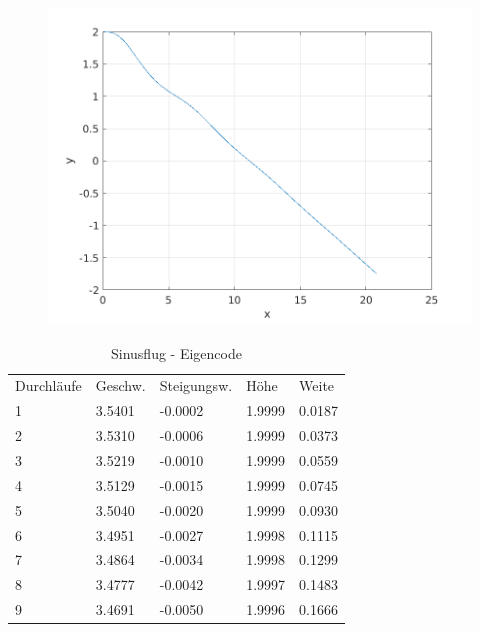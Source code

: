 \documentclass[a4paper,12pt]{scrartcl}
\begin{document}
\begin{figure}[htp]
	\centering
	\includegraphics{flightpath2.png}
	\label{fig:sin}
\end{figure}
\begin{table}
\centering
\caption{Sinusflug - Eigencode}
\begin{tabular}{lllll}
Durchläufe & Geschw. & Steigungsw. & Höhe   & Weite   \\
1          & 3.5401  & -0.0002     & 1.9999 & 0.0187  \\
2          & 3.5310  & -0.0006     & 1.9999 & 0.0373  \\
3          & 3.5219  & -0.0010     & 1.9999 & 0.0559  \\
4          & 3.5129  & -0.0015     & 1.9999 & 0.0745  \\
5          & 3.5040  & -0.0020     & 1.9999 & 0.0930  \\
6          & 3.4951  & -0.0027     & 1.9998 & 0.1115  \\
7          & 3.4864  & -0.0034     & 1.9998 & 0.1299  \\
8          & 3.4777  & -0.0042     & 1.9997 & 0.1483  \\
9          & 3.4691  & -0.0050     & 1.9996 & 0.1666 
\end{tabular}
\end{table}
\end{document}
